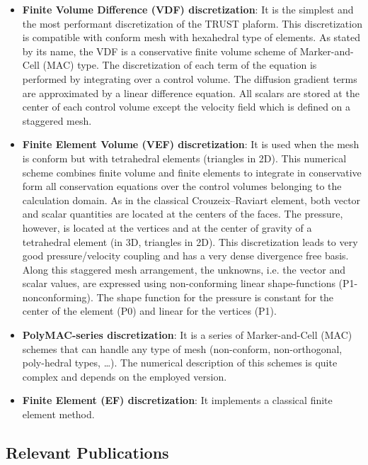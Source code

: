 \begin{itemize}
\item \textbf{Finite Volume Difference (VDF) discretization}: It is the simplest and the most performant discretization of the TRUST plaform. This discretization is compatible with conform mesh with hexahedral type of elements. As stated by its name, the VDF is a conservative finite volume scheme of Marker-and-Cell (MAC) type. The discretization of each term of the equation is performed by integrating over a control volume. The diffusion gradient terms are approximated by a linear difference equation. All scalars are stored at the center of each control volume except the velocity field which is defined on a staggered mesh.

\item \textbf{Finite Element Volume (VEF) discretization}: It is used when the mesh is conform but with tetrahedral elements (triangles in 2D). This numerical scheme combines finite volume and finite elements to integrate in conservative form all conservation equations over the control volumes belonging to the calculation domain. As in the classical Crouzeix–Raviart element, both vector and scalar quantities are located at the centers of the faces. The pressure, however, is located at the vertices and at the center of gravity of a tetrahedral element (in 3D, triangles in 2D). This discretization leads to very good pressure/velocity coupling and has a very dense divergence free basis. Along this staggered mesh arrangement, the unknowns, i.e. the vector and scalar values, are expressed using non-conforming linear shape-functions (P1-nonconforming). The shape function for the pressure is constant for the center of the element (P0) and linear for the vertices (P1).

\item \textbf{PolyMAC-series discretization}: It is a series of Marker-and-Cell (MAC) schemes that can handle any type of mesh (non-conform, non-orthogonal, poly-hedral types, …). The numerical description of this schemes is quite complex and depends on the employed version.

\item \textbf{Finite Element (EF) discretization}: It implements a classical finite element method.
\end{itemize}

\subsection{Relevant Publications}
\label{sec:TRUST Platform:publications}

